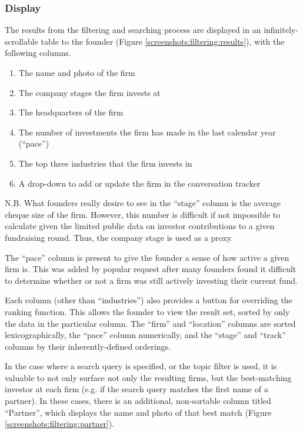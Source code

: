 \subsubsection{Display}

The results from the filtering and searching process are displayed in an infinitely-scrollable table to the founder (Figure \ref{screenshots:filtering:results}), with the following columns.

\begin{enumerate}
  \item The name and photo of the firm
  \item The company stages the firm invests at
  \item The headquarters of the firm
  \item The number of investments the firm has made in the last calendar year (``pace'')
  \item The top three industries that the firm invests in
  \item A drop-down to add or update the firm in the conversation tracker
\end{enumerate}

N.B. What founders really desire to see in the ``stage'' column is the average cheque size of the firm. However, this number is difficult if not impossible to calculate given the limited public data on investor contributions to a given fundraising round. Thus, the company stage is used as a proxy.

The ``pace'' column is present to give the founder a sense of how active a given firm is. This was added by popular request after many founders found it difficult to determine whether or not a firm was still actively investing their current fund.

Each column (other than ``industries'') also provides a button for overriding the ranking function. This allows the founder to view the result set, sorted by only the data in the particular column. The ``firm'' and ``location'' columns are sorted lexicographically, the ``pace'' column numerically, and the ``stage'' and ``track'' columns by their inherently-defined orderings.

In the case where a search query is specified, or the topic filter is used, it is valuable to not only surface not only the resulting firms, but the best-matching investor at each firm (e.g. if the search query matches the first name of a partner). In these cases, there is an additional, non-sortable column titled ``Partner'', which displays the name and photo of that best match (Figure \ref{screenshots:filtering:partner}).

